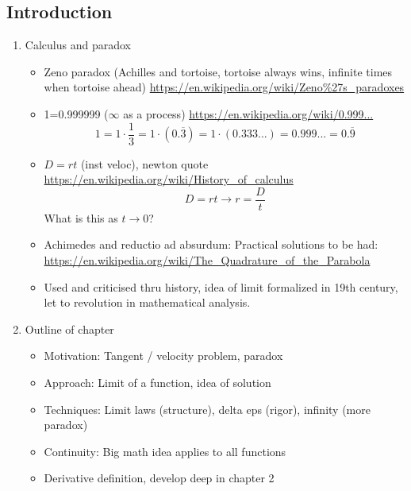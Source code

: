\documentclass{article}
\begin{document}
\subsection{Introduction}
\begin{enumerate}

\item Calculus and paradox
\begin{itemize}
\item Zeno paradox (Achilles and tortoise, tortoise always wins, infinite times when tortoise ahead) \url{https://en.wikipedia.org/wiki/Zeno%27s_paradoxes}
\item 1=0.999999 ($\infty$ as a process) \url{https://en.wikipedia.org/wiki/0.999...}
\[
1 = 1 \cdot \frac{1}{3} = 1 \cdot (0.\overline{3}) = 1 \cdot (0.333...) = 0.999... = 0.\overline{9}
\]
\item $D= rt$ (inst veloc), newton quote \url{https://en.wikipedia.org/wiki/History_of_calculus}
\[
D = rt \rightarrow r = \frac{D}{t}
\]
What is this as $t \rightarrow 0$?
\item Achimedes and reductio ad absurdum: Practical solutions to be had: \url{https://en.wikipedia.org/wiki/The_Quadrature_of_the_Parabola}
\item Used and criticised thru history, idea of limit formalized in 19th century, let to revolution in mathematical analysis.
\end{itemize}

\item Outline of chapter
\begin{itemize}
\item Motivation: Tangent / velocity problem, paradox
\item Approach: Limit of a function, idea of solution
\item Techniques: Limit laws (structure), delta eps (rigor), infinity (more paradox)
\item Continuity: Big math idea applies to all functions
\item Derivative definition, develop deep in chapter 2
\end{itemize}

\end{enumerate}
\end{document}
